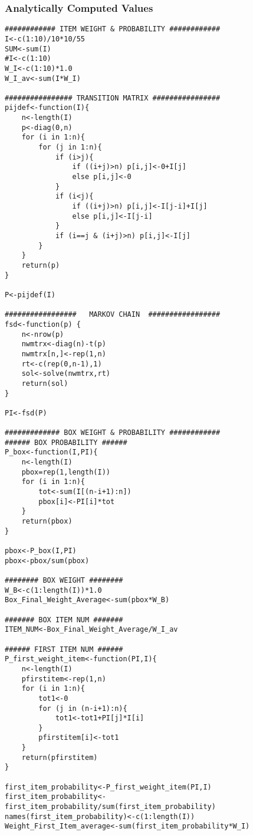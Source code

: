 \documentclass{article}
\begin{document}
\subsubsection{Analytically Computed Values}
\begin{lstlisting}
############ ITEM WEIGHT & PROBABILITY ############
I<-c(1:10)/10*10/55
SUM<-sum(I)
#I<-c(1:10)
W_I<-c(1:10)*1.0
W_I_av<-sum(I*W_I)

################ TRANSITION MATRIX ################
pijdef<-function(I){
	n<-length(I)
	p<-diag(0,n)
	for (i in 1:n){
		for (j in 1:n){
			if (i>j){
				if ((i+j)>n) p[i,j]<-0+I[j]
				else p[i,j]<-0
			}
			if (i<j){
				if ((i+j)>n) p[i,j]<-I[j-i]+I[j]
				else p[i,j]<-I[j-i]
			}
			if (i==j & (i+j)>n) p[i,j]<-I[j]
		}
	}
	return(p)
}

P<-pijdef(I)

#################   MARKOV CHAIN  #################
fsd<-function(p) {
	n<-nrow(p)
	nwmtrx<-diag(n)-t(p)
	nwmtrx[n,]<-rep(1,n)
	rt<-c(rep(0,n-1),1)
	sol<-solve(nwmtrx,rt)
	return(sol)
}

PI<-fsd(P)

############# BOX WEIGHT & PROBABILITY ############
###### BOX PROBABILITY ######
P_box<-function(I,PI){
	n<-length(I)
	pbox=rep(1,length(I))
	for (i in 1:n){
		tot<-sum(I[(n-i+1):n])
		pbox[i]<-PI[i]*tot
	}
	return(pbox)
}

pbox<-P_box(I,PI)
pbox<-pbox/sum(pbox)

######## BOX WEIGHT ########
W_B<-c(1:length(I))*1.0
Box_Final_Weight_Average<-sum(pbox*W_B)

####### BOX ITEM NUM #######
ITEM_NUM<-Box_Final_Weight_Average/W_I_av

###### FIRST ITEM NUM ######
P_first_weight_item<-function(PI,I){
	n<-length(I)
	pfirstitem<-rep(1,n)
	for (i in 1:n){
		tot1<-0
		for (j in (n-i+1):n){
			tot1<-tot1+PI[j]*I[i]		
		}
		pfirstitem[i]<-tot1
	}
	return(pfirstitem)
}

first_item_probability<-P_first_weight_item(PI,I)
first_item_probability<-first_item_probability/sum(first_item_probability)
names(first_item_probability)<-c(1:length(I))
Weight_First_Item_average<-sum(first_item_probability*W_I)
\end{lstlisting}
\end{document}
